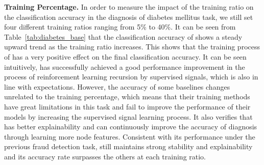 \textbf{Training Percentage.}
In order to measure the impact of the training ratio on the classification accuracy in the diagnosis of diabetes mellitus task, we still set four different training ratios ranging from 5\% to 40\%. 
It can be seen from Table~\ref{tab:diabetes_base} that the classification accuracy of \RioGNN shows a steady upward trend as the training ratio increases. 
This shows that the training process of \RioGNN has a very positive effect on the final classification accuracy. 
It can be seen intuitively, \RioGNN has successfully achieved a good performance improvement in the process of reinforcement learning recursion by supervised signals, which is also in line with expectations. 
However, the accuracy of some baselines changes unrelated to the training percentage, which means that their training methods have great limitations in this task and fail to improve the performance of their models by increasing the supervised signal learning process. 
It also verifies that \RioGNN has better explainability and can continuously improve the accuracy of diagnosis through learning more node features. 
Consistent with its performance under the previous fraud detection task, \RioGNN still maintains strong stability and explainability and its accuracy rate surpasses the others at each training ratio. 




\begin{table}[t]
    \setlength{\abovecaptionskip}{0.cm}
    \setlength{\belowcaptionskip}{-0.cm}
    \caption{Diabetes diagnosis classification results ($\%$) compared to \RioGNN variants.}\label{tab:diabetes-variants}
    \centering
\end{table}


